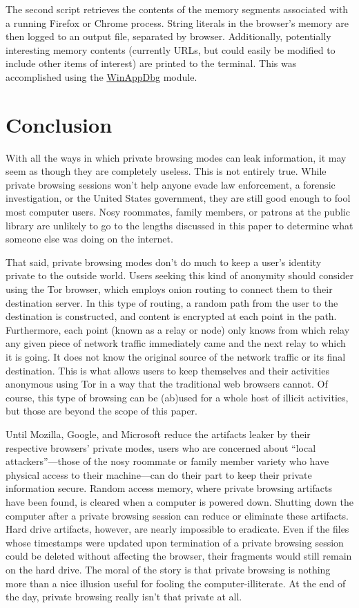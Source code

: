 \documentclass[pdftex,letterpaper,titlepage,12pt]{article}
\begin{document}
	The second script retrieves the contents of the memory segments associated
	with a running Firefox or Chrome process. String literals in the browser's
	memory are then logged to an output file, separated by browser.
	Additionally, potentially interesting memory contents (currently URLs, but
	could easily be modified to include other items of interest) are printed to
	the terminal. This was accomplished using the 
	\href{http://winappdbg.sourceforge.net/}{WinAppDbg} module.

  \section{Conclusion}
  With all the ways in which private browsing modes can leak information, it
  may seem as though they are completely useless. This is not entirely true.
  While private browsing sessions won't help anyone evade law enforcement, a
  forensic investigation, or the United States government, they are still good
  enough to fool most computer users. Nosy roommates, family members, or
  patrons at the public library are unlikely to go to the lengths discussed in
  this paper to determine what someone else was doing on the internet.

  That said, private browsing modes don't do much to keep a user's identity
  private to the outside world. Users seeking this kind of anonymity should 
  consider using the Tor browser, which employs onion routing to connect them 
  to their destination server. In this type of routing, a random path from the 
  user to the destination is constructed, and content is encrypted at each 
  point in the path. Furthermore, each point (known as a relay or node) only 
  knows from which relay any given piece of network traffic immediately came 
  and the next relay to which it is going. It does not know the original source
  of the network traffic or its final destination. This is what allows users to
  keep themselves and their activities anonymous using Tor in a way that the 
  traditional web browsers cannot.\cite{tor13} Of course, this type of browsing
  can be (ab)used for a whole host of illicit activities, but those are beyond
  the scope of this paper.

  Until Mozilla, Google, and Microsoft reduce the artifacts leaker by their
  respective browsers' private modes, users who are concerned about ``local 
  attackers''---those of the nosy roommate or family member variety who have 
  physical access to their machine---can do their part to keep their private
  information secure. Random access memory, where private browsing artifacts
  have been found, is cleared when a computer is powered down. Shutting down
  the computer after a private browsing session can reduce or eliminate these
  artifacts. Hard drive artifacts, however, are nearly impossible to eradicate.
  Even if the files whose timestamps were updated upon termination of a 
  private browsing session could be deleted without affecting the browser, 
  their fragments would still remain on the hard drive. The moral of the story 
  is that private browsing is nothing more than a nice illusion useful for 
  fooling the computer-illiterate. At the end of the day, private browsing 
  really isn't that private at all.
\end{document}
